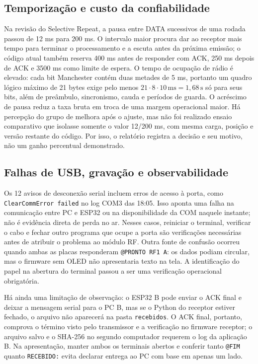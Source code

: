 \documentclass[12pt,a4paper]{article}
\begin{document}
\subsection{Temporização e custo da confiabilidade}
Na revisão do Selective Repeat, a pausa entre DATA sucessivos de uma rodada passou de 12 ms para 200 ms. O intervalo maior procura dar ao receptor mais tempo para terminar o processamento e a escuta antes da próxima emissão; o código atual também reserva 400 ms antes de responder com ACK, 250 ms depois de ACK e 3500 ms como limite de espera. O tempo de ocupação de rádio é elevado: cada bit Manchester contém duas metades de 5 ms, portanto um quadro lógico máximo de 21 bytes exige pelo menos $21\cdot 8\cdot 10\,\mathrm{ms}=1{,}68\,\mathrm{s}$ só para seus bits, além de preâmbulo, sincronismo, cauda e períodos de guarda. O acréscimo de pausa reduz a taxa bruta em troca de uma margem operacional maior. Há percepção do grupo de melhora após o ajuste, mas não foi realizado ensaio comparativo que isolasse somente o valor 12/200 ms, com mesma carga, posição e versão restante do código. Por isso, o relatório registra a decisão e seu motivo, não um ganho percentual demonstrado.

\subsection{Falhas de USB, gravação e observabilidade}
Os 12 avisos de desconexão serial incluem erros de acesso à porta, como \texttt{ClearCommError failed} no log COM3 das 18:05. Isso aponta uma falha na comunicação entre PC e ESP32 ou na disponibilidade da COM naquele instante; não é evidência direta de perda no ar. Nesses casos, reiniciar o terminal, verificar o cabo e fechar outro programa que ocupe a porta são verificações necessárias antes de atribuir o problema ao módulo RF. Outra fonte de confusão ocorreu quando ambas as placas responderam \texttt{@PRONTO RF1 A}: os dados podiam circular, mas o firmware sem OLED não apresentaria texto na tela. A identificação do papel na abertura do terminal passou a ser uma verificação operacional obrigatória.

Há ainda uma limitação de observação: o ESP32 B pode enviar o ACK final e deixar a mensagem serial para o PC B, mas se o Python do receptor estiver fechado, o arquivo não aparecerá na pasta \texttt{recebidos}. O ACK final, portanto, comprova o término visto pelo transmissor e a verificação no firmware receptor; o arquivo salvo e o SHA-256 no segundo computador requerem o log da aplicação B. Na apresentação, manter ambos os terminais abertos e conferir tanto \texttt{@FIM} quanto \texttt{RECEBIDO:} evita declarar entrega ao PC com base em apenas um lado.
\end{document}

